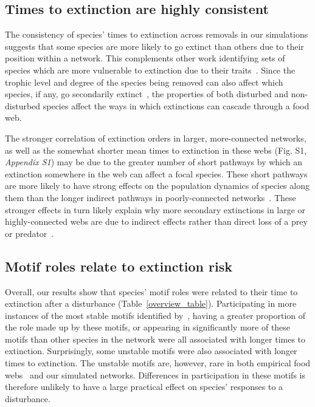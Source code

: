 \documentclass[12pt]{article}
\begin{document}
 	\subsection*{Times to extinction are highly consistent}

		The consistency of species' times to extinction across removals in our simulations suggests that some species are more likely to go extinct than others due to their position within a network.
        This complements other work identifying sets of species which are more vulnerable to extinction due to their traits~\citep{Curtsdotter2011,Ryser2019}. 
		Since the trophic level and degree of the species being removed can also affect which species, if any, go secondarily extinct~\citep{Wootton2016a,Dunne2002}, the properties of both disturbed and non-disturbed species affect the ways in which extinctions can cascade through a food web.
		
		
		The stronger correlation of extinction orders in larger, more-connected networks, as well as the somewhat shorter mean times to extinction in these webs (Fig. S1, \emph{Appendix S1}) may be due to the greater number of short pathways by which an extinction somewhere in the web can affect a focal species. 
		These short pathways are more likely to have strong effects on the population dynamics of species along them than the longer indirect pathways in poorly-connected networks~\citep{Jordan2002,Jordan2006}.
		These stronger effects in turn likely explain why more secondary extinctions in large or highly-connected webs are due to indirect effects rather than direct loss of a prey or predator~\citet{Wootton2016a}. 


	\subsection*{Motif roles relate to extinction risk}

		Overall, our results show that species' motif roles were related to their time to extinction after a disturbance (Table~\ref{overview_table}).
		Participating in more instances of the most stable motifs identified by~\citet{Stouffer2007,Borrelli2015a}, having a greater proportion of the role made up by these motifs, or appearing in significantly more of these motifs than other species in the network were all associated with longer times to extinction. 
		Surprisingly, some unstable motifs were also associated with longer times to extinction.
		The unstable motifs are, however, rare in both empirical food webs~\citep{Stouffer2007} and our simulated networks.
		Differences in participation in these motifs is therefore unlikely to have a large practical effect on species' responses to a disturbance.
        
\end{document}
